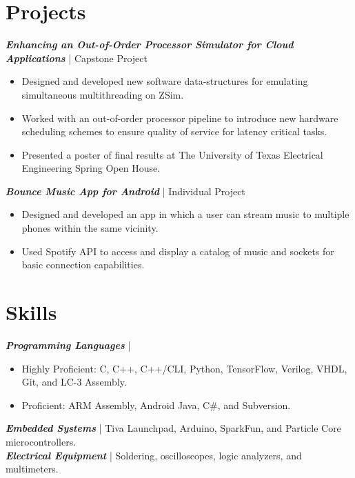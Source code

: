 \documentclass[letter]{res}
\begin{document}
\begin{resume}
\section{Projects}
{\sl \textbf{Enhancing an Out-of-Order Processor Simulator for Cloud Applications}} | Capstone Project\\

 \vspace{-4mm}
 
\begin{itemize}
 \item Designed and developed new software data-structures for emulating simultaneous multithreading on ZSim.
 \item Worked with an out-of-order processor pipeline to introduce new hardware scheduling schemes to ensure quality of service for latency critical tasks.
 \item Presented a poster of final results at The University of Texas Electrical Engineering Spring Open House.
\end{itemize}

\vspace{-2mm}

{\sl \textbf{Bounce Music App for Android}} | Individual Project\\

 \vspace{-4mm}
 
\begin{itemize}
 \item Designed and developed an app in which a user can stream music to multiple phones within the same vicinity.
 \item Used Spotify API to access and display a catalog of music and sockets for basic connection capabilities.
\end{itemize}

\vspace{-2mm}
 
\section{Skills}
{\sl \textbf{Programming Languages}} | 
\begin{itemize}
 \item Highly Proficient: C, C++, C++/CLI, Python, TensorFlow, Verilog, VHDL, Git, and LC-3 Assembly.
 \item Proficient: ARM Assembly, Android Java, C\#, and Subversion.
\end{itemize}
 \vspace{-4mm}
{\sl \textbf{Embedded Systems}} | Tiva Launchpad, Arduino, SparkFun, and Particle Core microcontrollers.\\
{\sl \textbf{Electrical Equipment}} | Soldering, oscilloscopes, logic analyzers, and multimeters.\\


\end{resume}
\end{document}
